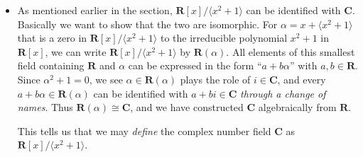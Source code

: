 \documentclass[11pt]{article}
\newcommand{\R}{\mathbf{R}}
\newcommand{\C}{\mathbf{C}}
\newcommand{\la}{\langle}
\newcommand{\ra}{\rangle}
\renewcommand{\simeq}{\cong}
\begin{document}
\begin{itemize}
\begin{proof}
        The uniqueness of expression of $\beta$ clearly has to do with the minimal degree $n$ of $p(x)$. Suppose \[\beta = b_0 + b_1 \alpha + \dots + b_{n-1} \alpha^{n-1} = b_0' + b_1' \alpha + \dots +b_{n-1}' \alpha^{n-1},\] then \[(b_0 - b_0') + (b_1 - b_1') \alpha + \dots + (b_{n-1} - b_{n-1}')\alpha^{n-1} = 0.\] It is then obvious that $\alpha$ is a zero to the polynomial $(b_0 - b_0') + (b_1 - b_1') x + \dots + (b_{n-1} - b_{n-1}')x^{n-1} \in F[x]$, which is of degree $\leq n-1 < n = \deg(p)$, if this polynomial is nonzero. This leads to contradiction, and thus the polynomial from subtraction must be the zero polynomial, showing that the expression of $\beta \in E$ must be unique.
    \end{proof}
    \item As mentioned earlier in the section, $\R[x]/\la x^2+1 \ra$ can be identified with $\C$. Basically we want to show that the two are isomorphic. For $\alpha = x + \la x^2+1 \ra$ that is a zero in $\R[x]/\la x^2+1 \ra$ to the irreducible polynomial $x^2+1$ in $\R[x]$, we can write $\R[x]/\la x^2+1 \ra$ by $\R(\alpha)$. All elements of this smallest field containing $\R$ and $\alpha$ can be expressed in the form ``$a+b\alpha$'' with $a,b \in \R$. Since $\alpha^2 + 1 = 0$, we see $\alpha \in \R(\alpha)$ plays the role of $i \in \C$, and every $a+b\alpha \in \R(\alpha)$ can be identified with $a+bi \in \C$ \emph{through a change of names}. Thus $\R(\alpha) \simeq \C$, and we have constructed $\C$ algebraically from $\R$.
    
    This tells us that we may \emph{define} the complex number field $\C$ as $\R[x]/\la x^2 + 1 \ra$.
\end{itemize}
\end{document}
